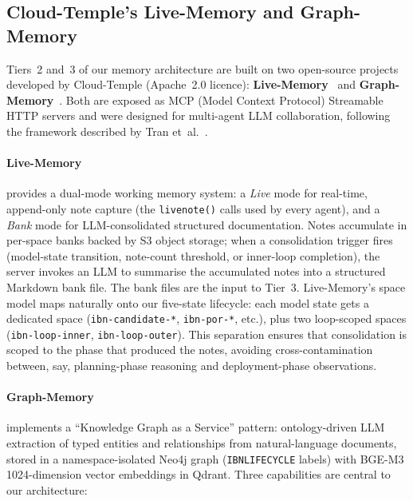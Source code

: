 \documentclass[acmtog]{acmart}
\renewcommand\_{\textunderscore\allowbreak}
\begin{document}
\subsection{Cloud-Temple's Live-Memory and Graph-Memory}

Tiers~2 and~3 of our memory architecture are built on two
open-source projects developed by Cloud-Temple (Apache~2.0
licence): \textbf{Live-Memory}~\cite{livememory} and
\textbf{Graph-Memory}~\cite{graphmemory}. Both are exposed as
MCP (Model Context Protocol) Streamable HTTP servers and were
designed for multi-agent LLM collaboration, following the
framework described by Tran et~al.~\cite{tran2025}.

\paragraph{Live-Memory} provides a dual-mode working memory
system: a \emph{Live} mode for real-time, append-only note
capture (the \texttt{live\_note()} calls used by every agent),
and a \emph{Bank} mode for LLM-consolidated structured
documentation. Notes accumulate in per-space banks backed by S3
object storage; when a consolidation trigger fires (model-state
transition, note-count threshold, or inner-loop completion), the
server invokes an LLM to summarise the accumulated notes into a
structured Markdown bank file. The bank files are the input to
Tier~3. Live-Memory's space model maps naturally onto our
five-state lifecycle: each model state gets a dedicated space
(\texttt{ibn-candidate-*}, \texttt{ibn-por-*}, etc.), plus two
loop-scoped spaces (\texttt{ibn-loop-inner},
\texttt{ibn-loop-outer}). This separation ensures that
consolidation is scoped to the phase that produced the notes,
avoiding cross-contamination between, say, planning-phase
reasoning and deployment-phase observations.

\paragraph{Graph-Memory} implements a ``Knowledge Graph as a
Service'' pattern: ontology-driven LLM extraction of typed
entities and relationships from natural-language documents,
stored in a namespace-isolated Neo4j graph
(\texttt{IBN\_LIFECYCLE\_*} labels) with BGE-M3 1024-dimension
vector embeddings in Qdrant. Three capabilities are central to
our architecture:
\end{document}
